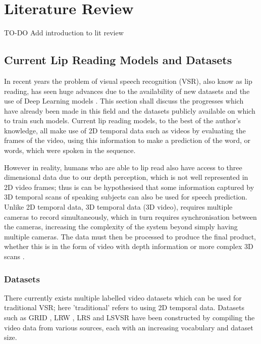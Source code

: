 \documentclass[12pt]{report}
\begin{document}
\chapter{Literature Review}

TO-DO
Add introduction to lit review

\section{Current Lip Reading Models and Datasets}

In recent years the problem of visual speech recognition (VSR), also know as lip reading, has seen huge advances due to the availability of new datasets and the use of Deep Learning models \cite{Chung2016, Chung2017, Shillingford2018}.
This section shall discuss the progresses which have already been made in this field and the datasets publicly available on which to train such models.
Current lip reading models, to the best of the author's knowledge, all make use of 2D temporal data such as videos by evaluating the frames of the video, using this information to make a prediction of the word, or words, which were spoken in the sequence.

However in reality, humans who are able to lip read also have access to three dimensional data due to our depth perception, which is not well represented in 2D video frames; thus is can be hypothesised that some information captured by 3D temporal scans of speaking subjects can also be used for speech prediction.
Unlike 2D temporal data, 3D temporal data (3D video), requires multiple cameras to record simultaneously, which in turn requires synchronisation between the cameras, increasing the complexity of the system beyond simply having multiple cameras.
The data must then be processed to produce the final product, whether this is in the form of video with depth information or more complex 3D scans \cite{Li2017}.

\subsection{Datasets}
There currently exists multiple labelled video datasets which can be used for traditional VSR; here 'traditional' refers to using 2D temporal data.
Datasets such as GRID \cite{Cooke2006}, LRW \cite{Chung2016}, LRS \cite{Chung2017} and LSVSR \cite{Shillingford2018} have been constructed by compiling the video data from various sources, each with an increasing vocabulary and dataset size.
\end{document}
